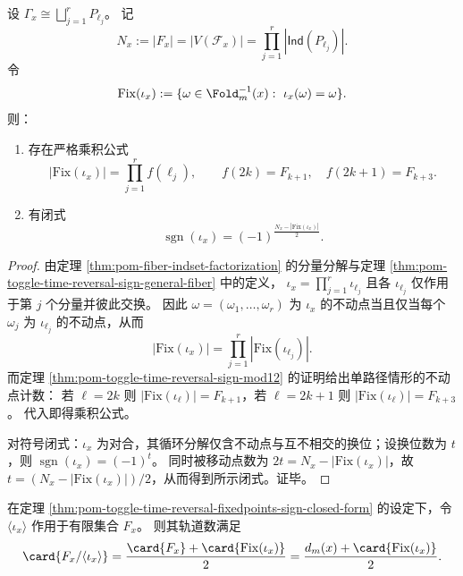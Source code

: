 \begin{theorem}[时间反演的不动点乘积公式与符号闭式]\label{thm:pom-toggle-time-reversal-fixedpoints-sign-closed-form}
设 \(\Gamma_x\cong\bigsqcup_{j=1}^r P_{\ell_j}\)。
记
\[
N_x:=|F_x|=|V(\mathcal F_x)|=\prod_{j=1}^r |\mathsf{Ind}(P_{\ell_j})|.
\]
令
\[
\mathrm{Fix}(\iota_x):=\{\omega\in \Fold_m^{-1}(x):\ \iota_x(\omega)=\omega\}.
\]
则：
\begin{enumerate}
  \item 存在严格乘积公式
  \[
  |\mathrm{Fix}(\iota_x)|=\prod_{j=1}^r f(\ell_j),
  \qquad
  f(2k)=F_{k+1},\quad f(2k+1)=F_{k+3}.
  \]
  \item 有闭式
  \[
  \operatorname{sgn}(\iota_x)=(-1)^{\frac{N_x-|\mathrm{Fix}(\iota_x)|}{2}}.
  \]
\end{enumerate}
\end{theorem}
\begin{proof}
由定理 \ref{thm:pom-fiber-indset-factorization} 的分量分解与定理 \ref{thm:pom-toggle-time-reversal-sign-general-fiber} 中的定义，
\(
\iota_x=\prod_{j=1}^r \iota_{\ell_j}
\)
且各 \(\iota_{\ell_j}\) 仅作用于第 \(j\) 个分量并彼此交换。
因此 \(\omega=(\omega_1,\dots,\omega_r)\) 为 \(\iota_x\) 的不动点当且仅当每个 \(\omega_j\) 为 \(\iota_{\ell_j}\) 的不动点，从而
\[
|\mathrm{Fix}(\iota_x)|=\prod_{j=1}^r |\mathrm{Fix}(\iota_{\ell_j})|.
\]
而定理 \ref{thm:pom-toggle-time-reversal-sign-mod12} 的证明给出单路径情形的不动点计数：
若 \(\ell=2k\) 则 \(|\mathrm{Fix}(\iota_\ell)|=F_{k+1}\)，若 \(\ell=2k+1\) 则 \(|\mathrm{Fix}(\iota_\ell)|=F_{k+3}\)。
代入即得乘积公式。
\par
对符号闭式：\(\iota_x\) 为对合，其循环分解仅含不动点与互不相交的换位；设换位数为 \(t\)，则 \(\operatorname{sgn}(\iota_x)=(-1)^t\)。
同时被移动点数为 \(2t=N_x-|\mathrm{Fix}(\iota_x)|\)，故 \(t=(N_x-|\mathrm{Fix}(\iota_x)|)/2\)，从而得到所示闭式。证毕。
\end{proof}

\begin{corollary}[时间反演对合的轨道数闭式]\label{cor:pom-time-reversal-orbit-count}
在定理 \ref{thm:pom-toggle-time-reversal-fixedpoints-sign-closed-form} 的设定下，令 \(\langle \iota_x\rangle\) 作用于有限集合 \(F_x\)。
则其轨道数满足
\[
\card{F_x/\langle \iota_x\rangle}
=\frac{\card{F_x}+\card{\mathrm{Fix}(\iota_x)}}{2}
=\frac{d_m(x)+\card{\mathrm{Fix}(\iota_x)}}{2}.
\]
\end{corollary}

